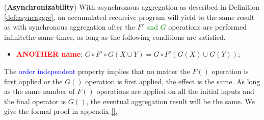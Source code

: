 {\begin{theorem}
	\label{th:async}
	(\textbf{Asynchronizability}) With asynchronous aggregation as described in Definition \ref{def:asyncaggre}, an accumulated recursive program will yield to the same result as with synchronous aggregation after the $F'$ \textcolor{green}{and $G$} operations are performed {\color{green}infinite}the same times, as long as the following conditions are satisfied.
	\begin{itemize}
		\item \textbf{\textcolor{red}{ANOTHER name}}: $G\circ F'\circ G(X\cup Y)=G\circ F'( G(X)\cup G(Y))$;
	\end{itemize}
\end{theorem}
The \textcolor{blue}{order independent} property implies that no matter the $F()$ operation is first applied or the $G()$ operation is first applied, the effect is the same. As long as the same number of $F()$ operations are applied on all the initial inputs and the final operator is $G()$, the eventual aggregation result will be the same.%
We give the formal proof in appendix \ref{},
}
